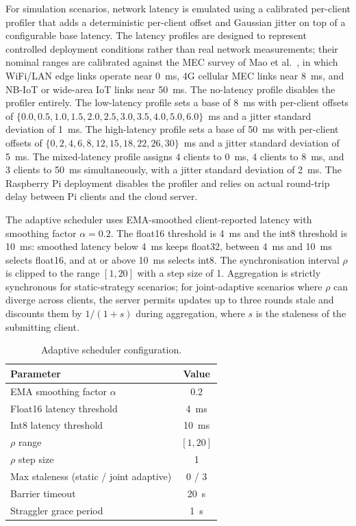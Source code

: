 \documentclass[conference]{IEEEtran}
\begin{document}
For simulation scenarios, network latency is emulated using a calibrated per-client profiler that adds a deterministic per-client offset and Gaussian jitter on top of a configurable base latency. The latency profiles are designed to represent controlled deployment conditions rather than real network measurements; their nominal ranges are calibrated against the MEC survey of Mao et al.~\cite{8016573}, in which WiFi/LAN edge links operate near 0~ms, 4G cellular MEC links near 8~ms, and NB-IoT or wide-area IoT links near 50~ms. The no-latency profile disables the profiler entirely. The low-latency profile sets a base of 8~ms with per-client offsets of $\{0.0, 0.5, 1.0, 1.5, 2.0, 2.5, 3.0, 3.5, 4.0, 5.0, 6.0\}$~ms and a jitter standard deviation of 1~ms. The high-latency profile sets a base of 50~ms with per-client offsets of $\{0, 2, 4, 6, 8, 12, 15, 18, 22, 26, 30\}$~ms and a jitter standard deviation of 5~ms. The mixed-latency profile assigns 4 clients to 0~ms, 4 clients to 8~ms, and 3 clients to 50~ms simultaneously, with a jitter standard deviation of 2~ms. The Raspberry Pi deployment disables the profiler and relies on actual round-trip delay between Pi clients and the cloud server.

The adaptive scheduler uses EMA-smoothed client-reported latency with smoothing factor $\alpha = 0.2$. The float16 threshold is 4~ms and the int8 threshold is 10~ms: smoothed latency below 4~ms keeps float32, between 4~ms and 10~ms selects float16, and at or above 10~ms selects int8. The synchronisation interval $\rho$ is clipped to the range $[1, 20]$ with a step size of 1. Aggregation is strictly synchronous for static-strategy scenarios; for joint-adaptive scenarios where $\rho$ can diverge across clients, the server permits updates up to three rounds stale and discounts them by $1/(1 + s)$ during aggregation, where $s$ is the staleness of the submitting client.

\begin{table}[H]
\centering
\caption{Adaptive scheduler configuration.}
\label{tab:compression_scheduler_config}
\small
\begin{tabularx}{\columnwidth}{Xc}
\toprule
\textbf{Parameter} & \textbf{Value} \\
\midrule
EMA smoothing factor $\alpha$           & 0.2 \\
Float16 latency threshold               & 4~ms \\
Int8 latency threshold                  & 10~ms \\
$\rho$ range                            & $[1, 20]$ \\
$\rho$ step size                        & 1 \\
Max staleness (static / joint adaptive) & 0 / 3 \\
Barrier timeout                         & 20~s \\
Straggler grace period                  & 1~s \\
\bottomrule
\end{tabularx}
\end{table}
\end{document}
